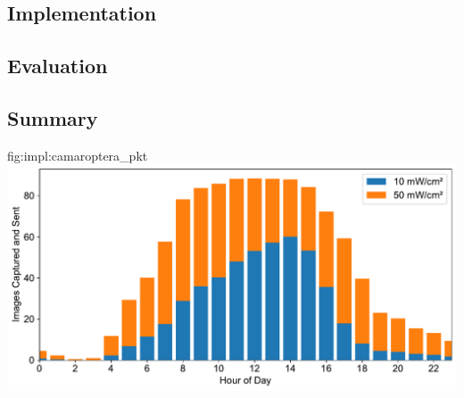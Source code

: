 \subsection{Implementation}

\subsection{Evaluation}


\subsection{Summary}

\begin{definefigure}{fig:impl:camaroptera_pkt}
    \centering
    \includegraphics[width=\linewidth]{figs/chap6/camaroptera_performance.pdf}
    \caption{
        The distribution of simulated Camaroptera transmitted image packets per hour in a day. 
        The distribution represents an average over the length of two synthesized outdoor traces (10 and 50\ssi[per-mode=symbol]{\milli\watt\per\centi\meter\squared}) based on the EnHANTs Setup D trace. 
        Camaroptera operation is limited to times when daylight is available, regardless of the scale of average input power. The average number of packets is significantly lower between 6PM and 6AM.
     }
\end{definefigure}

